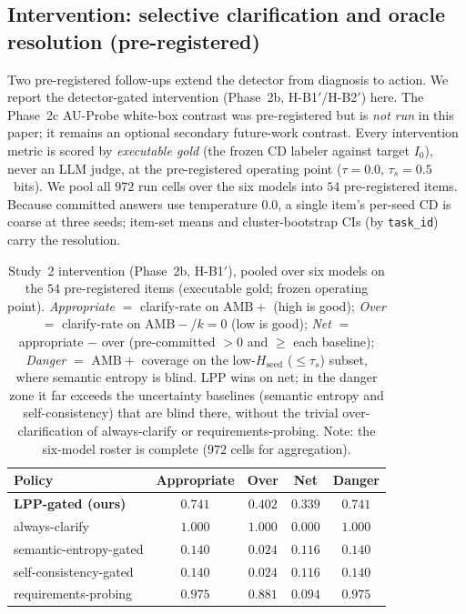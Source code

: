 \documentclass[acmsmall,screen,nonacm]{acmart}
\newcommand{\cd}{\textsf{CD}}
\newcommand{\Hseed}{\ensuremath{H_{\mathrm{seed}}}}
\begin{document}
\subsection{Intervention: selective clarification and oracle resolution (pre-registered)}
\label{sec:study2-intervention}
Two pre-registered follow-ups extend the detector from diagnosis to action. We report the detector-gated
intervention (Phase~2b, H-B1$'$/H-B2$'$) here. The Phase~2c AU-Probe white-box contrast was pre-registered
but is \emph{not run} in this paper; it remains an optional secondary future-work contrast. Every intervention metric is scored by \emph{executable gold} (the frozen
\cd{} labeler against target $I_0$), never an LLM judge, at the pre-registered operating point
($\tau{=}0.0$, $\tau_s{=}0.5$~bits). We pool all $972$ run cells over the six models into $54$ pre-registered items. Because committed answers use temperature $0.0$, a single item's per-seed \cd{} is coarse at three
seeds; item-set means and cluster-bootstrap CIs (by \texttt{task\_id}) carry the resolution.

\begin{table}[t]
\centering
\caption{Study~2 intervention (Phase~2b, H-B1$'$), pooled over six models on the $54$ pre-registered items
(executable gold; frozen operating point). \emph{Appropriate} $=$ clarify-rate on $\mathrm{AMB}{+}$ (high is
good); \emph{Over} $=$ clarify-rate on $\mathrm{AMB}{-}$/$k{=}0$ (low is good); \emph{Net} $=$
appropriate $-$ over (pre-committed $>0$ and $\ge$ each baseline); \emph{Danger} $=$ $\mathrm{AMB}{+}$
coverage on the low-\Hseed{} ($\le\!\tau_s$) subset, where semantic entropy is blind. LPP wins on net; in the
danger zone it far exceeds the uncertainty baselines (semantic entropy and self-consistency) that are blind there,
without the trivial over-clarification of always-clarify or requirements-probing. Note: the six-model roster
is complete ($972$ cells for aggregation).}
\label{tab:study2-intervention}
\footnotesize
\setlength{\tabcolsep}{4pt}
\begin{tabular}{@{}lcccc@{}}
\toprule
Policy & Appropriate & Over & Net & Danger \\
\midrule
\textbf{LPP-gated (ours)} & $0.741$ & $0.402$ & $\mathbf{0.339}$ & $\mathbf{0.741}$ \\
always-clarify           & $1.000$ & $1.000$ & $0.000$ & $1.000$ \\
semantic-entropy-gated   & $0.140$ & $0.024$ & $0.116$ & $0.140$ \\
self-consistency-gated   & $0.140$ & $0.024$ & $0.116$ & $0.140$ \\
requirements-probing     & $0.975$ & $0.881$ & $0.094$ & $0.975$ \\
\bottomrule
\end{tabular}
\end{table}
\end{document}
